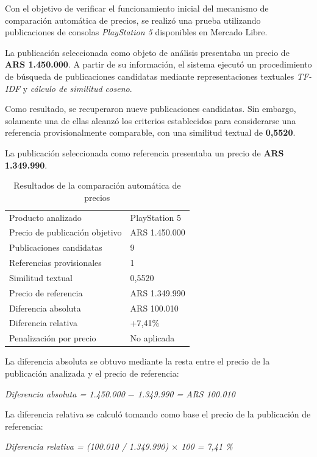 Con el objetivo de verificar el funcionamiento inicial del mecanismo de
comparación automática de precios, se realizó una prueba utilizando
publicaciones de consolas \emph{PlayStation 5} disponibles en Mercado
Libre.

La publicación seleccionada como objeto de análisis presentaba un precio
de \textbf{ARS 1.450.000}. A partir de su información, el sistema
ejecutó un procedimiento de búsqueda de publicaciones candidatas
mediante representaciones textuales \emph{TF-IDF} y \emph{cálculo de
similitud coseno}.

Como resultado, se recuperaron nueve publicaciones candidatas. Sin
embargo, solamente una de ellas alcanzó los criterios establecidos para
considerarse una referencia provisionalmente comparable, con una
similitud textual de \textbf{0,5520}.

La publicación seleccionada como referencia presentaba un precio de
\textbf{ARS 1.349.990}.

\begin{table}[H]
\centering
\caption{Resultados de la comparación automática de precios}
\label{tab:ml-precio-ps5}
\small
\begin{tabularx}{\textwidth}{L l}
\toprule
{} &  \\
\midrule
Producto analizado & PlayStation 5 \\
Precio de publicación objetivo & ARS 1.450.000 \\
Publicaciones candidatas & 9 \\
Referencias provisionales & 1 \\
Similitud textual & 0,5520 \\
Precio de referencia & ARS 1.349.990 \\
Diferencia absoluta & ARS 100.010 \\
Diferencia relativa & +7,41\% \\
Penalización por precio & No aplicada \\
\bottomrule
\end{tabularx}
\end{table}

La diferencia absoluta se obtuvo mediante la resta entre el precio de la
publicación analizada y el precio de referencia:

\emph{Diferencia absoluta = 1.450.000 $-$ 1.349.990 = ARS 100.010}

La diferencia relativa se calculó tomando como base el precio de la
publicación de referencia:

\emph{Diferencia relativa = (100.010 / 1.349.990) $\times$ 100 = 7,41 \%}

